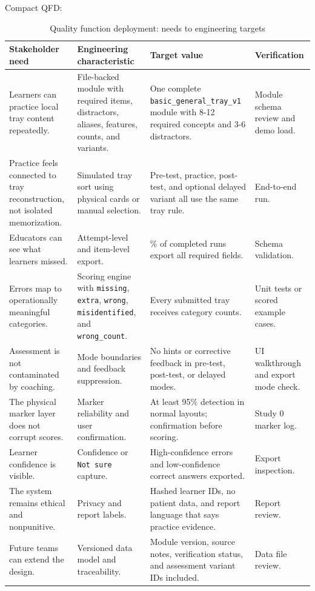 \documentclass[10pt,a4paper]{article}
\begin{document}
Compact QFD:
\begin{table}[H]
\centering
\caption{Quality function deployment: needs to engineering targets}
\label{tab:quality-function-deployment-needs-to-engineering-targets}
\small\renewcommand{\arraystretch}{1.2}\setlength{\tabcolsep}{4pt}
\begin{tabularx}{\textwidth}{|>{\raggedright\arraybackslash}X|>{\raggedright\arraybackslash}X|>{\raggedright\arraybackslash}X|>{\raggedright\arraybackslash}X|}
\hline
Stakeholder need & Engineering characteristic & Target value & Verification \\
\hline
Learners can practice local tray content repeatedly. & File-backed module with required items, distractors, aliases, features, counts, and variants. & One complete \texttt{basic\_general\_tray\_v1} module with 8-12 required concepts and 3-6 distractors. & Module schema review and demo load. \\
\hline
Practice feels connected to tray reconstruction, not isolated memorization. & Simulated tray sort using physical cards or manual selection. & Pre-test, practice, post-test, and optional delayed variant all use the same tray rule. & End-to-end run. \\
\hline
Educators can see what learners missed. & Attempt-level and item-level export. & 100\% of completed runs export all required fields. & Schema validation. \\
\hline
Errors map to operationally meaningful categories. & Scoring engine with \texttt{missing}, \texttt{extra}, \texttt{wrong}, \texttt{misidentified}, and \texttt{wrong\_count}. & Every submitted tray receives category counts. & Unit tests or scored example cases. \\
\hline
Assessment is not contaminated by coaching. & Mode boundaries and feedback suppression. & No hints or corrective feedback in pre-test, post-test, or delayed modes. & UI walkthrough and export mode check. \\
\hline
The physical marker layer does not corrupt scores. & Marker reliability and user confirmation. & At least 95\% detection in normal layouts; confirmation before scoring. & Study 0 marker log. \\
\hline
Learner confidence is visible. & Confidence or \texttt{Not sure} capture. & High-confidence errors and low-confidence correct answers exported. & Export inspection. \\
\hline
The system remains ethical and nonpunitive. & Privacy and report labels. & Hashed learner IDs, no patient data, and report language that says practice evidence. & Report review. \\
\hline
Future teams can extend the design. & Versioned data model and traceability. & Module version, source notes, verification status, and assessment variant IDs included. & Data file review. \\
\hline
\end{tabularx}
\end{table}
\end{document}
